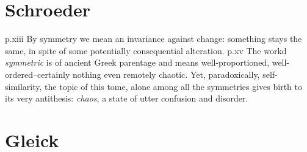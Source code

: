 \documentclass[11pt]{book}
\begin{document}
\section{Schroeder}
p.xiii
  By symmetry we mean an invariance against change: something stays the same, in spite of some potentially consequential alteration.
p.xv
  The workd \textit{symmetric} is of ancient Greek parentage and means well-proportioned, well-ordered--certainly nothing even remotely chaotic.
  Yet, paradoxically, self-similarity, the topic of this tome, alone among all the symmetries gives birth to its very antithesis: \textit{chaos},
  a state of utter confusion and disorder.
 
\section{Gleick}
\end{document}
